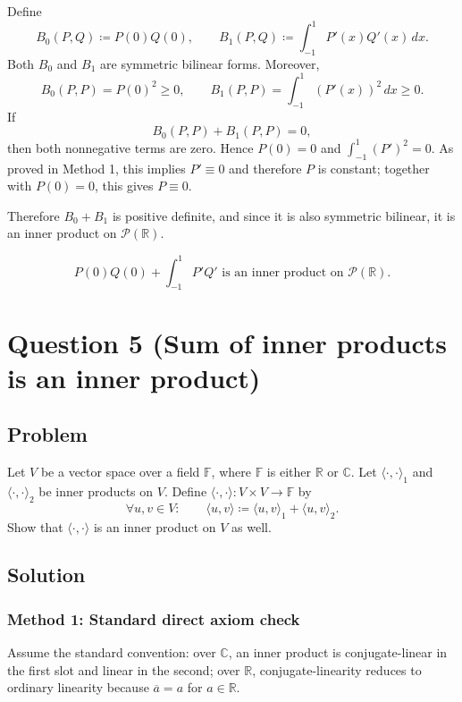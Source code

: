 \documentclass[12pt]{article}
\newcommand{\df}{\coloneqq}
\newcommand{\F}{\mathbb{F}}
\newcommand{\R}{\mathbb{R}}
\newcommand{\C}{\mathbb{C}}
\begin{document}
Define
\[
B_0(P,Q)\df P(0)Q(0),
\qquad
B_1(P,Q)\df \int_{-1}^{1}P'(x)Q'(x)\,dx.
\]
Both $B_0$ and $B_1$ are symmetric bilinear forms. Moreover,
\[
B_0(P,P)=P(0)^2\ge 0,
\qquad
B_1(P,P)=\int_{-1}^{1}(P'(x))^2\,dx\ge 0.
\]
If
\[
B_0(P,P)+B_1(P,P)=0,
\]
then both nonnegative terms are zero. Hence $P(0)=0$ and $\int_{-1}^{1}(P')^2=0$. As proved in Method 1, this implies $P'\equiv 0$ and therefore $P$ is constant; together with $P(0)=0$, this gives $P\equiv 0$.

Therefore $B_0+B_1$ is positive definite, and since it is also symmetric bilinear, it is an inner product on $\mathcal{P}(\R)$.

\[
\boxed{\,P(0)Q(0)+\int_{-1}^{1}P'Q'\text{ is an inner product on }\mathcal{P}(\R).\,}
\]

\newpage
\section{Question 5 (Sum of inner products is an inner product)}
\subsection{Problem}
Let $V$ be a vector space over a field $\F$, where $\F$ is either $\R$ or $\C$.
Let $\langle\cdot,\cdot\rangle_1$ and $\langle\cdot,\cdot\rangle_2$ be inner products on $V$.
Define $\langle\cdot,\cdot\rangle : V\times V\to \F$ by
\[
\forall u,v\in V:\qquad
\langle u,v\rangle \df \langle u,v\rangle_1+\langle u,v\rangle_2.
\]
Show that $\langle\cdot,\cdot\rangle$ is an inner product on $V$ as well.

\newpage
\subsection{Solution}

\subsubsection{Method 1: Standard direct axiom check}
Assume the standard convention: over $\C$, an inner product is conjugate-linear in the first slot and linear in the second; over $\R$, conjugate-linearity reduces to ordinary linearity because $\overline{a}=a$ for $a\in\R$.
\end{document}
